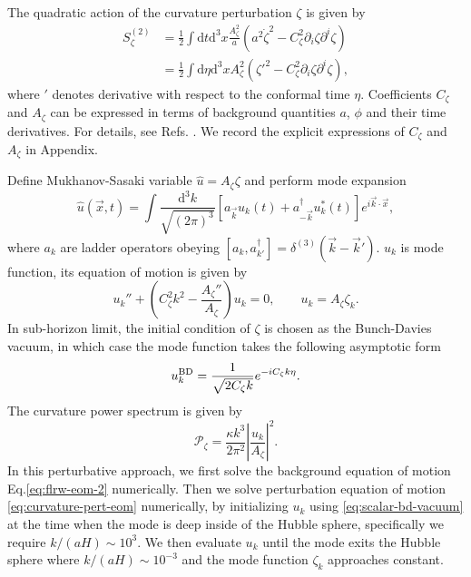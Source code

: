 \documentclass[reprint, 10pt, amsmath, amssymb, floatfix, aps, prd, superscriptaddress, nofootinbib, nobibnotes,twocolumn]{revtex4-1}
\def\dd{{\mathrm{d}}}
\begin{document}
The quadratic action of the curvature perturbation $\zeta$ is given by
\begin{align}
    S_\zeta^{(2)} & = \frac12\int\dd t\dd^3x\frac{A_\zeta^2}{a}\left(a^2\dot\zeta^2 - C_\zeta^2\partial_i\zeta\partial^i\zeta\right)\nonumber\\
    & = \frac12\int\dd\eta\dd^3x A_\zeta^2 \left(\zeta'^2 - C_\zeta^2\partial_i\zeta\partial^i\zeta\right),
\end{align}
where ${}'$ denotes derivative with respect to the conformal time $\eta$. Coefficients $C_\zeta$ and $A_\zeta$ can be expressed in terms of background quantities $a$, $\phi$ and their time derivatives. For details, see Refs. \cite{Kawai:2021bye,Kawai:2021edk}. We record the explicit expressions of $C_\zeta$ and $A_\zeta$ in Appendix.

Define Mukhanov-Sasaki variable $\hat u = A_\zeta\zeta$ and perform mode expansion
\begin{equation}\label{eq:u-mode-expansion}
	\hat u(\vec x, t) = \int\frac{\dd^3k}{\sqrt{(2\pi)^3}}\left[a_{\vec k} u_k(t) + a_{-\vec k}^\dagger u_k^\ast(t)\right] e^{i\vec k\cdot\vec x},
\end{equation}
where $a_k$ are ladder operators obeying $[a_k, a_{k'}^\dagger] = \delta^{(3)}(\vec k - \vec k')$. $u_k$ is mode function, its equation of motion is given by
\begin{equation}\label{eq:curvature-pert-eom}
    u_k'' + \left(C_\zeta^2k^2 - \frac{A_\zeta''}{A_\zeta}\right)u_k = 0, \qquad u_k = A_\zeta\zeta_k.
\end{equation}
In sub-horizon limit, the initial condition of $\zeta$ is chosen as the Bunch-Davies vacuum, in which case the mode function takes the following asymptotic form
\begin{equation}\label{eq:scalar-bd-vacuum}
	u_k^{\rm BD} = \frac{1}{\sqrt{2C_\zeta k}}e^{-iC_\zeta k\eta}.
\end{equation}
The curvature power spectrum is given by
\begin{equation}
	\mathcal P_\zeta = \frac{\kappa k^3}{2\pi^2}\left|\frac{u_k}{A_\zeta}\right|^2.
\end{equation}
In this perturbative approach, we first solve the background equation of motion Eq.\eqref{eq:flrw-eom-2} numerically. Then we solve perturbation equation of motion \eqref{eq:curvature-pert-eom} numerically, by initializing $u_k$ using \eqref{eq:scalar-bd-vacuum} at the time when the mode is deep inside of the Hubble sphere, specifically we require $k / (aH) \sim 10^3$. We then evaluate $u_k$ until the mode exits the Hubble sphere where $k / (aH) \sim 10^{-3}$ and the mode function $\zeta_k$ approaches constant.
\end{document}
